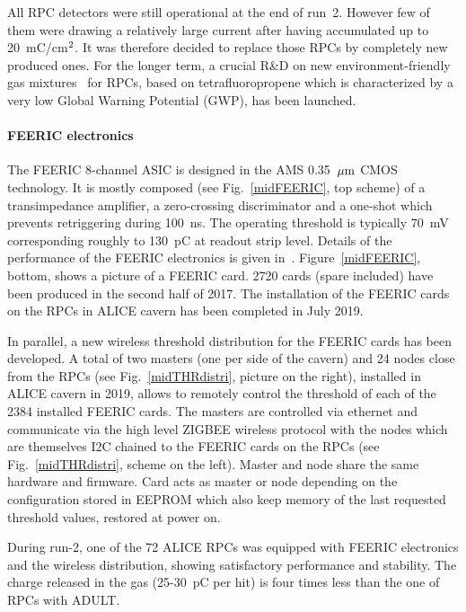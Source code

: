 All RPC detectors were still operational at the end of run~2. However few of them were drawing a relatively large current after having accumulated up to 20~mC/cm$^{\rm 2}$.
It was therefore decided to replace those RPCs by completely new produced ones. For the longer term, a crucial R\&D on new environment-friendly 
gas mixtures~\cite{mid:RPCgasmix} for RPCs, based on tetrafluoropropene which is characterized by a very low Global Warning Potential (GWP), has been launched.


\paragraph{FEERIC electronics\\}
 
The FEERIC 8-channel ASIC is designed in the AMS 0.35~$\mu{\rm m}$ CMOS technology. It is mostly composed (see Fig.~\ref{midFEERIC}, top scheme) of a transimpedance amplifier, a zero-crossing discriminator and a one-shot 
which prevents retriggering during 100~ns. The operating threshold is typically 70~mV corresponding roughly to 130~pC at readout strip level. Details of the performance of the FEERIC electronics 
is given in~\cite{mid:FEERIC-PRR}. Figure~\ref{midFEERIC}, bottom, shows a picture of a FEERIC card. 2720 cards (spare included) have been produced in the second half of 2017.
The installation of the FEERIC cards on the RPCs in ALICE cavern has been completed in July 2019. 

In parallel, a new wireless threshold distribution for the FEERIC cards has been developed. 
A total of two masters (one per side of the cavern) and 24 nodes close from the RPCs (see Fig.~\ref{midTHRdistri}, picture on the right), installed in ALICE cavern in 2019, allows to remotely control the threshold of each of the 2384 installed 
FEERIC cards. The masters are controlled via ethernet and communicate via the high level ZIGBEE wireless protocol with the nodes which are themselves I2C chained to the FEERIC cards on the RPCs (see Fig.~\ref{midTHRdistri}, 
scheme on the left). Master and node share the same hardware and firmware. Card acts as master or node depending on the configuration stored in EEPROM which also keep memory of the last requested threshold values, restored
at power on.  

During run-2, one of the 72 ALICE RPCs was equipped with FEERIC electronics and the wireless distribution, showing satisfactory performance and stability. The charge released in the gas (25-30~pC per hit) is four times less 
than the one of RPCs with ADULT.

